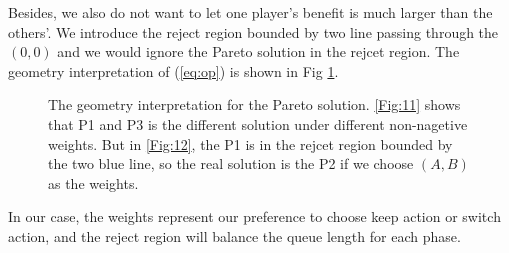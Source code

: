 \documentclass[a4paper, 10pt, conference]{ieeeconf}      %
\begin{document}
Besides, we also do not want to let one player's benefit is much larger than the others'. We introduce the reject region bounded by two line 
passing through the $(0,0)$ and we would ignore the Pareto solution in the rejcet region. 
The geometry interpretation of (\ref{eq:op}) is shown in Fig \ref{fig:Pareto}.
\begin{figure}[thbp]
        \centering
        \hfill
        \par
        \caption{The geometry interpretation for the Pareto solution. 
        \ref{Fig:11} shows that P1 and P3 is the different solution under different non-nagetive weights. But in \ref{Fig:12}, 
        the P1 is in the rejcet region bounded by the two blue line, so the real solution is the P2 if we choose $(A,B)$ as the weights.}
        \label{fig:Pareto}
\end{figure}

In our case, the weights represent our 
preference to choose keep action or switch action, and the reject region will balance the queue length for each phase. 
\end{document}
